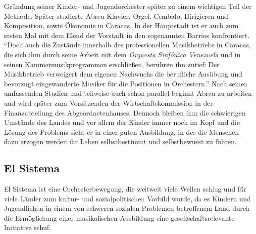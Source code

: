 Gründung seiner Kinder- und Jugendorchester später zu einem wichtigen Teil der
Methode. Später studierte Abreu Klavier, Orgel, Cembalo, Dirigieren und
Komposition, sowie Ökonomie in Caracas. In der Hauptstadt ist er auch zum ersten
Mal mit dem Elend der Vorstadt in den sogenannten Barrios konfrontiert.
\enquote{Doch auch die Zustände innerhalb des professionellen Musikbetriebs in
Caracas, die sich ihm durch seine Arbeit mit dem \emph{Orquesta Sinfónica Venezuela}
und in seinen Kammermusikprogrammen erschließen, berühren ihn zutief: Der
Musikbetrieb verweigert dem eigenen Nachwuchs die berufliche Ausübung und
bevorzugt eingewanderte Musiker für die Positionen in
Orchestern.}\autocite[28]{kaufmann:el_sistema} Nach seinen umfassenden Studien
und teilweise auch schon parallel beginnt Abreu zu arbeiten und wird später zum
Vorsitzenden der Wirtschaftskommission in der Finanzabteilung des
Abgeordnetenhauses. Dennoch bleiben ihm die schwierigen Umstände des Landes und
vor allem der Kinder immer noch im Kopf und die Lösung des Problems
sieht er in einer guten Ausbildung, in der die Menschen dazu erzogen werden ihr
Leben selbstbestimmt und selbstbewusst zu
führen.\autocite[31]{kaufmann:el_sistema} 



\subsection{El Sistema}
El Sistema ist eine Orchesterbewegung, die weltweit viele Wellen schlug und für
viele Länder zum kultur- und sozialpolitischen Vorbild wurde, da es Kindern und
Jugendlichen in einem von schweren sozialen Problemen betroffenem Land durch die
Ermöglichung einer musikalischen Ausbildung eine gesellschaftsrelevante
Initiative schuf. 

